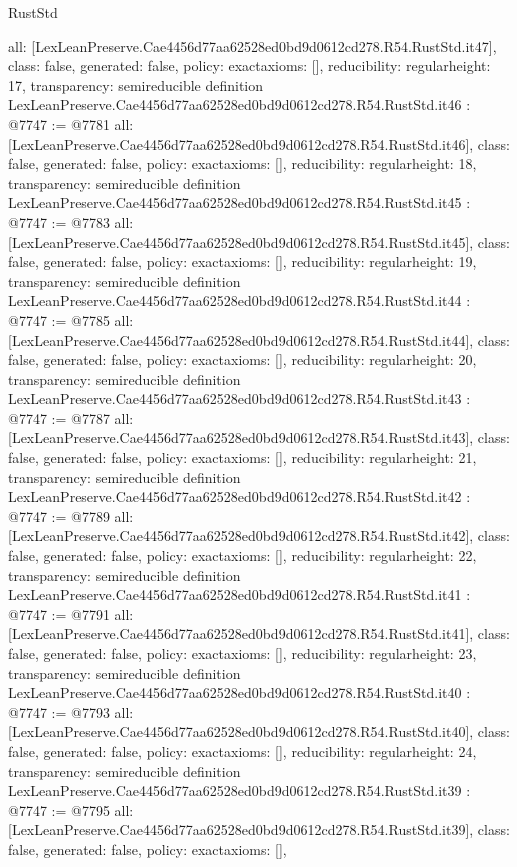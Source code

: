\begin{lexlean}{RustStd}
\begin{coremodule}
{  all: [LexLeanPreserve.Cae4456d77aa62528ed0bd9d0612cd278.R54.RustStd.it47],
  class: false,
  generated: false,
  policy: exact{axioms: []},
  reducibility: regular{height: 17},
  transparency: semireducible
}
definition LexLeanPreserve.Cae4456d77aa62528ed0bd9d0612cd278.R54.RustStd.it46 : @7747 := @7781 {
  all: [LexLeanPreserve.Cae4456d77aa62528ed0bd9d0612cd278.R54.RustStd.it46],
  class: false,
  generated: false,
  policy: exact{axioms: []},
  reducibility: regular{height: 18},
  transparency: semireducible
}
definition LexLeanPreserve.Cae4456d77aa62528ed0bd9d0612cd278.R54.RustStd.it45 : @7747 := @7783 {
  all: [LexLeanPreserve.Cae4456d77aa62528ed0bd9d0612cd278.R54.RustStd.it45],
  class: false,
  generated: false,
  policy: exact{axioms: []},
  reducibility: regular{height: 19},
  transparency: semireducible
}
definition LexLeanPreserve.Cae4456d77aa62528ed0bd9d0612cd278.R54.RustStd.it44 : @7747 := @7785 {
  all: [LexLeanPreserve.Cae4456d77aa62528ed0bd9d0612cd278.R54.RustStd.it44],
  class: false,
  generated: false,
  policy: exact{axioms: []},
  reducibility: regular{height: 20},
  transparency: semireducible
}
definition LexLeanPreserve.Cae4456d77aa62528ed0bd9d0612cd278.R54.RustStd.it43 : @7747 := @7787 {
  all: [LexLeanPreserve.Cae4456d77aa62528ed0bd9d0612cd278.R54.RustStd.it43],
  class: false,
  generated: false,
  policy: exact{axioms: []},
  reducibility: regular{height: 21},
  transparency: semireducible
}
definition LexLeanPreserve.Cae4456d77aa62528ed0bd9d0612cd278.R54.RustStd.it42 : @7747 := @7789 {
  all: [LexLeanPreserve.Cae4456d77aa62528ed0bd9d0612cd278.R54.RustStd.it42],
  class: false,
  generated: false,
  policy: exact{axioms: []},
  reducibility: regular{height: 22},
  transparency: semireducible
}
definition LexLeanPreserve.Cae4456d77aa62528ed0bd9d0612cd278.R54.RustStd.it41 : @7747 := @7791 {
  all: [LexLeanPreserve.Cae4456d77aa62528ed0bd9d0612cd278.R54.RustStd.it41],
  class: false,
  generated: false,
  policy: exact{axioms: []},
  reducibility: regular{height: 23},
  transparency: semireducible
}
definition LexLeanPreserve.Cae4456d77aa62528ed0bd9d0612cd278.R54.RustStd.it40 : @7747 := @7793 {
  all: [LexLeanPreserve.Cae4456d77aa62528ed0bd9d0612cd278.R54.RustStd.it40],
  class: false,
  generated: false,
  policy: exact{axioms: []},
  reducibility: regular{height: 24},
  transparency: semireducible
}
definition LexLeanPreserve.Cae4456d77aa62528ed0bd9d0612cd278.R54.RustStd.it39 : @7747 := @7795 {
  all: [LexLeanPreserve.Cae4456d77aa62528ed0bd9d0612cd278.R54.RustStd.it39],
  class: false,
  generated: false,
  policy: exact{axioms: []},
}
\end{coremodule}
\end{lexlean}
